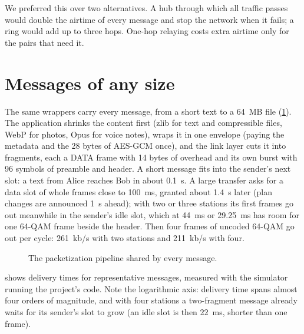 \documentclass[11pt,a4paper,oneside]{report}
\begin{document}
We preferred this over two alternatives. A hub through which all traffic passes would double the
airtime of every message and stop the network when it fails; a ring would add up to three hops.
One-hop relaying costs extra airtime only for the pairs that need it.

\section{Messages of any size}\label{sec:anysize}
The same wrappers carry every message, from a short text to a \SI{64}{MB} file (\cref{fig:pipeline}).
The application shrinks the content first (zlib for text and compressible files, WebP for photos, Opus
for voice notes), wraps it in one envelope (paying the metadata and the 28 bytes of AES-GCM once),
and the link layer cuts it into fragments, each a DATA frame with 14 bytes of overhead and its own
burst with 96 symbols of preamble and header. A short message fits into the sender's next slot: a text
from Alice reaches Bob in about \SI{0.1}{s}. A large transfer asks for a data slot of whole frames close
to \SI{100}{ms}, granted about \SI{1.4}{s} later (plan changes are announced \SI{1}{s} ahead); with two
or three stations its first frames go out meanwhile in the sender's idle slot, which at \SI{44}{ms} or
\SI{29.25}{ms} has room for one 64-QAM frame beside the header. Then four frames of uncoded 64-QAM go out per cycle:
\SI{261}{kb/s} with two stations and \SI{211}{kb/s} with four.

\begin{figure}[htbp]
\centering
{}
\caption{The packetization pipeline shared by every message.}\label{fig:pipeline}
\end{figure}

 shows delivery times for representative messages, measured with the simulator
running the project's code. Note the logarithmic axis: delivery time spans almost four orders of
magnitude, and with four stations a two-fragment message already waits for its sender's slot to grow
(an idle slot is then \SI{22}{ms}, shorter than one frame).
\end{document}
